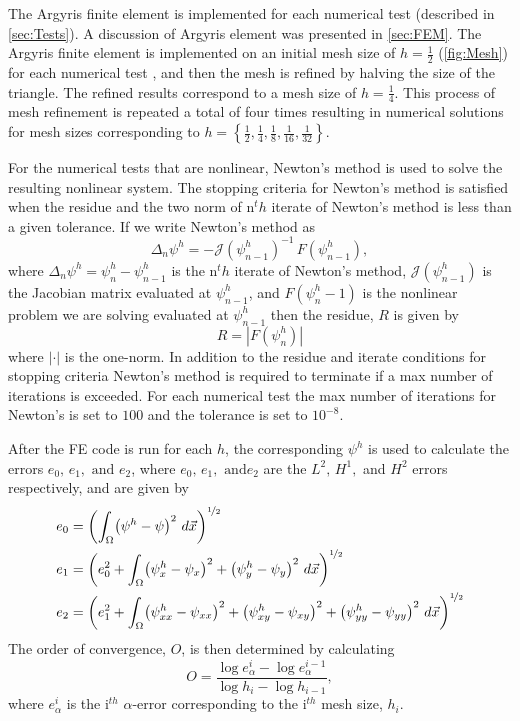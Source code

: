 The Argyris finite element is implemented for each numerical test (described in
\autoref{sec:Tests}). A discussion of Argyris element was presented in
\autoref{sec:FEM}. The Argyris finite element is implemented on an initial mesh
size of $h=\frac{1}{2}$ (\autoref{fig:Mesh}) for each numerical test , and then
the mesh is refined by halving the size of the triangle. The refined results
correspond to a mesh size of $h=\frac{1}{4}$.  This process of mesh refinement
is repeated a total of four times resulting in numerical solutions for mesh
sizes corresponding to
$h=\left\{\frac{1}{2},\frac{1}{4},\frac{1}{8},\frac{1}{16},\frac{1}{32}\right\}$.


For the numerical tests that are nonlinear, Newton's method is used to solve the
resulting nonlinear system. The stopping criteria for Newton's method is
satisfied when the residue and the two norm of n$^th$ iterate of Newton's method
is less than a given tolerance. If we write Newton's method as
\begin{equation*}
  \Delta_n \psi^h = -\mathcal{J}(\psi^h_{n-1})^{-1}\, F(\psi^h_{n-1}),
\end{equation*}
where $\Delta_n \psi^h = \psi^h_n - \psi^h_{n-1}$ is the n$^th$ iterate of
Newton's method, $\mathcal{J}(\psi^h_{n-1})$ is the Jacobian matrix evaluated at
$\psi^h_{n-1}$, and $F(\psi^h_n-1)$ is the nonlinear problem we are solving
evaluated at $\psi^h_{n-1}$ then the residue, $R$ is given by
\begin{equation*}
  R = \left|F(\psi^h_n)\right|
\end{equation*}
where $|\cdot|$ is the one-norm. In addition to the residue and iterate
conditions for stopping criteria Newton's method is required to terminate if a
max number of iterations is exceeded. For each numerical test the max number of
iterations for Newton's is set to $100$ and the tolerance is set to $10^{-8}$.

After the FE code is run for each $h$, the corresponding $\psi^h$ is used to
calculate the errors $e_0,\, e_1,\text{ and } e_2$, where $e_0,\, e_1,\text{ and
} e_2$ are the $L^2,\, H^1,$ and $H^2$ errors respectively, and are given by
\begin{align*}
  e_0 &= \left(\int_{\Omega}\!\left( \psi^h - \psi \right)^2 \,d\vec{x}\right)^{\nicefrac{1}{2}}\\
  e_1 &= \left(e_0^2 + \int_{\Omega}\!  \left( \psi^h_x - \psi_x \right)^2 + \left( \psi^h_y - \psi_y \right)^2
    \,d\vec{x}\right)^{\nicefrac{1}{2}}\\
  e_2 &= \left(e_1^2 + \int_{\Omega}\!  \left( \psi^h_{xx} - \psi_{xx} \right)^2 + \left( \psi^h_{xy} - \psi_{xy}
    \right)^2 + \left( \psi^h_{yy} - \psi_{yy} \right)^2 \,d\vec{x}\right)^{\nicefrac{1}{2}}\\
\end{align*}
The order of convergence, $O$, is then determined by calculating
\begin{equation*}
  O = \dfrac{\log e_{\alpha}^i - \log e_{\alpha}^{i-1}}{\log h_i - \log h_{i-1}},
\end{equation*}
where $e_{\alpha}^i$ is the i$^{th}$ $\alpha$-error corresponding to the
i$^{th}$ mesh size, $h_i$.

